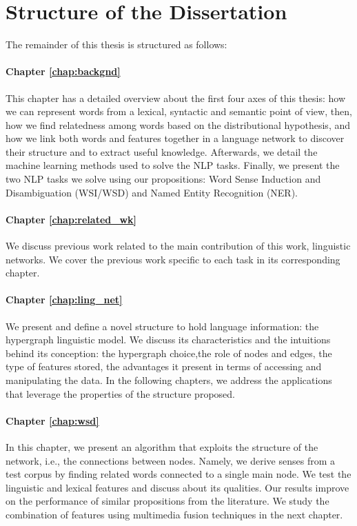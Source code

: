 \section{Structure of the Dissertation}
The remainder of this thesis is structured as follows:
\paragraph{Chapter \ref{chap:backgnd}} This chapter has a detailed overview about the first four axes of this thesis: how we can represent words from a lexical, syntactic and semantic point of view, then, how we find relatedness among words based on  the distributional hypothesis, and how we link both words and features together in a language network to discover their structure and to extract useful knowledge. 
%
Afterwards, we detail the machine learning methods used to solve the NLP tasks. Finally, we present the two NLP tasks we solve using our propositions: Word Sense Induction and Disambiguation (WSI/WSD) and Named Entity Recognition (NER).
\paragraph{Chapter \ref{chap:related_wk}} We discuss previous work related to the main contribution of this work, linguistic networks. We cover the previous work specific to each task in its corresponding chapter.

\paragraph{Chapter \ref{chap:ling_net}} We present and define a novel structure to hold language information: the hypergraph linguistic model.  We discuss its characteristics and the intuitions behind its conception: the hypergraph choice,the role of nodes and edges, the type of features stored, the advantages it present in terms of accessing and manipulating the data. In the following chapters, we address the applications that leverage the properties of the structure proposed.

\paragraph{Chapter \ref{chap:wsd}} In this chapter, we present an algorithm that exploits the structure of the network, i.e., the connections between nodes. Namely, we derive senses from a test corpus by finding related words connected to a single main node. We test the linguistic and lexical features and discuss about its qualities. Our results improve on the performance of similar propositions from the literature. We study the combination of features using multimedia fusion techniques in the next chapter.

